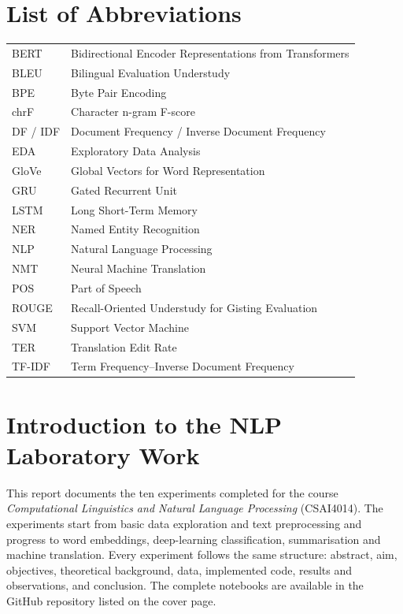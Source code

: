 \documentclass[12pt,a4paper,oneside]{report}
\begin{document}
\chapter*{List of Abbreviations}
\begin{tabular}{@{}p{3cm}p{11cm}@{}}
BERT & Bidirectional Encoder Representations from Transformers\\
BLEU & Bilingual Evaluation Understudy\\
BPE & Byte Pair Encoding\\
chrF & Character n-gram F-score\\
DF / IDF & Document Frequency / Inverse Document Frequency\\
EDA & Exploratory Data Analysis\\
GloVe & Global Vectors for Word Representation\\
GRU & Gated Recurrent Unit\\
LSTM & Long Short-Term Memory\\
NER & Named Entity Recognition\\
NLP & Natural Language Processing\\
NMT & Neural Machine Translation\\
POS & Part of Speech\\
ROUGE & Recall-Oriented Understudy for Gisting Evaluation\\
SVM & Support Vector Machine\\
TER & Translation Edit Rate\\
TF-IDF & Term Frequency--Inverse Document Frequency\\
\end{tabular}
\clearpage{}
\chapter{Introduction to the NLP Laboratory Work}
This report documents the ten experiments completed for the course \emph{Computational Linguistics and Natural Language Processing} (CSAI4014). The experiments start from basic data exploration and text preprocessing and progress to word embeddings, deep-learning classification, summarisation and machine translation. Every experiment follows the same structure: abstract, aim, objectives, theoretical background, data, implemented code, results and observations, and conclusion. The complete notebooks are available in the GitHub repository listed on the cover page.
\end{document}
